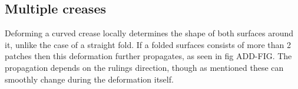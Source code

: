 \subsection{Multiple creases}
Deforming a curved crease locally determines the shape of both surfaces around it, unlike the case of a straight fold. If a folded surfaces consists of more than 2 patches then this deformation further propagates, as seen in fig ADD-FIG. The propagation depends on the rulings direction, though as mentioned these can smoothly change during the deformation itself.
